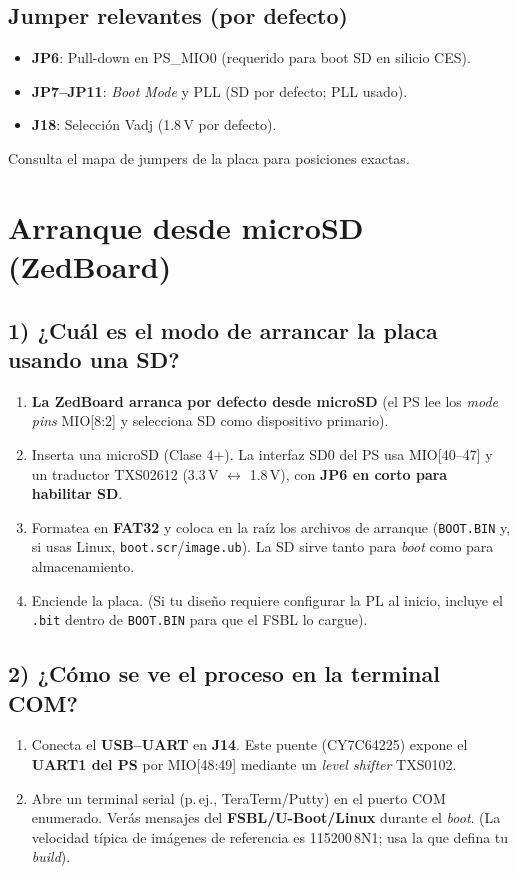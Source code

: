 \documentclass[a4paper,12pt]{article}
\begin{document}
\subsection{Jumper relevantes (por defecto)}
\begin{itemize}
  \item \textbf{JP6}: Pull-down en PS\_MIO0 (requerido para boot SD en silicio CES). 
  \item \textbf{JP7–JP11}: \emph{Boot Mode} y PLL (SD por defecto; PLL usado). 
  \item \textbf{J18}: Selección Vadj (1.8\,V por defecto). 
\end{itemize}
Consulta el mapa de jumpers de la placa para posiciones exactas. 

\section{Arranque desde microSD (ZedBoard)}
\subsection*{1) ¿Cuál es el modo de arrancar la placa usando una SD?}
\begin{enumerate}
  \item \textbf{La ZedBoard arranca por defecto desde microSD} (el PS lee los \emph{mode pins} MIO[8:2] y selecciona SD como dispositivo primario). 
  \item Inserta una microSD (Clase 4+). La interfaz SD0 del PS usa MIO[40--47] y un traductor TXS02612 (3.3\,V $\leftrightarrow$ 1.8\,V), con \textbf{JP6 en corto para habilitar SD}. 
  \item Formatea en \textbf{FAT32} y coloca en la raíz los archivos de arranque (\texttt{BOOT.BIN} y, si usas Linux, \texttt{boot.scr}/\texttt{image.ub}). La SD sirve tanto para \emph{boot} como para almacenamiento. 
  \item Enciende la placa. (Si tu diseño requiere configurar la PL al inicio, incluye el \texttt{.bit} dentro de \texttt{BOOT.BIN} para que el FSBL lo cargue).
\end{enumerate}

\subsection*{2) ¿Cómo se ve el proceso en la terminal COM?}
\begin{enumerate}
  \item Conecta el \textbf{USB--UART} en \textbf{J14}. Este puente (CY7C64225) expone el \textbf{UART1 del PS} por MIO[48:49] mediante un \emph{level shifter} TXS0102. 
  \item Abre un terminal serial (p.\,ej., TeraTerm/Putty) en el puerto COM enumerado. Verás mensajes del \textbf{FSBL/U-Boot/Linux} durante el \emph{boot}. (La velocidad típica de imágenes de referencia es 115200\,8N1; usa la que defina tu \emph{build}).
\end{enumerate}
\end{document}
